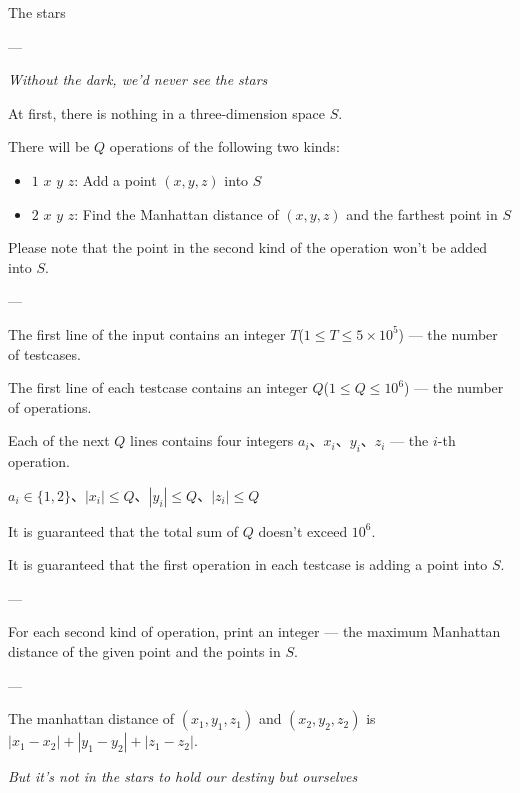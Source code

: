 
The stars

---


\begin{center}
\textit{Without the dark, we'd never see the stars}
\end{center}

At first, there is nothing in a three-dimension space $S$.

There will be $Q$ operations of the following two kinds:
\begin{itemize}
    \item $1$ $x$ $y$ $z$: Add a point $(x, y, z)$ into $S$
    \item $2$ $x$ $y$ $z$: Find the Manhattan distance of $(x, y, z)$ and the farthest point in $S$
\end{itemize}

Please note that the point in the second kind of the operation won't be added into $S$.

---


The first line of the input contains an integer $T$($1\leq T\leq 5\times 10^5$) --- the number of testcases.

The first line of each testcase contains an integer $Q$($1\leq Q\leq 10^6$) --- the number of operations.

Each of the next $Q$ lines contains four integers $a_i$、$x_i$、$y_i$、$z_i$ --- the $i$-th operation.

$a_i\in \{1, 2\}$、$|x_i| \leq Q$、$|y_i|\leq Q$、$|z_i|\leq Q$

It is guaranteed that the total sum of $Q$ doesn't exceed $10^6$.

It is guaranteed that the first operation in each testcase is adding a point into $S$.

---


For each second kind of operation, print an integer --- the maximum Manhattan distance of the given point and the points in $S$.

---


The manhattan distance of $(x_1, y_1, z_1)$ and $(x_2, y_2, z_2)$ is $|x_1 - x_2|+|y_1 - y_2|+|z_1 - z_2|$.

\begin{center}
\textit{But it's not in the stars to hold our destiny but ourselves}
\end{center}